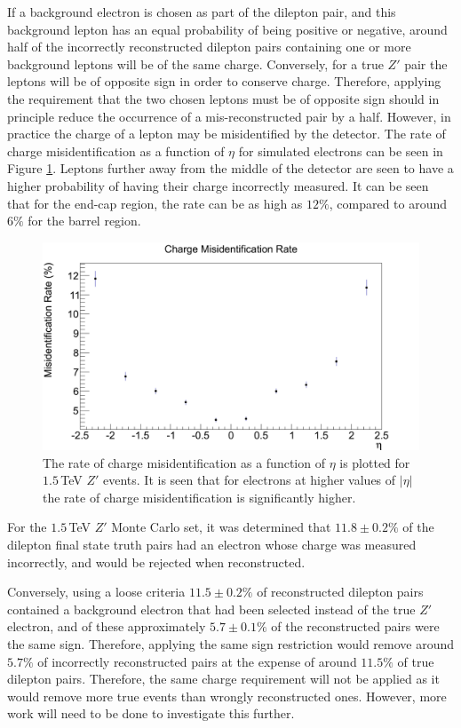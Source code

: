 \documentclass{article}
\begin{document}
If a background electron is chosen as part of the dilepton pair, and this background lepton has an equal probability of being positive or negative, around half of the incorrectly reconstructed dilepton pairs containing one or more background leptons will be of the same charge. Conversely, for a true $Z'$ pair the leptons will be of opposite sign in order to conserve charge. Therefore, applying the requirement that the two chosen leptons  must be of opposite sign should in principle reduce the occurrence of a mis-reconstructed pair by a half. However, in practice the charge of a lepton may be misidentified by the detector.
The rate of charge misidentification as a function of $\eta$ for simulated electrons can be seen in Figure \ref{fig:chargeMisID}. Leptons further away from the middle of the detector are seen to have a higher probability of having their charge incorrectly measured. It can be seen that for the end-cap region, the rate can be as high as $12\%$, compared to around $6\%$ for the barrel region.

\begin{figure}[h]
    \centering
    \includegraphics[scale=0.3]{images/chargeMisID.png}
    \caption{The rate of charge misidentification as a function of $\eta$ is plotted for $1.5\,$TeV $Z'$ events. It is seen that for electrons at higher values of $|\eta|$ the rate of charge misidentification is significantly higher. \label{fig:chargeMisID}}
\end{figure}


For the $1.5\,$TeV $Z'$ Monte Carlo set, it was determined that $11.8\pm0.2\%$ of the dilepton final state truth pairs had an electron whose charge was measured incorrectly, and would be rejected when reconstructed.

Conversely, using a loose criteria $11.5\pm0.2\%$ of reconstructed dilepton pairs contained a background electron that had been selected instead of the true $Z'$ electron, and of these approximately $5.7\pm0.1\%$ of the reconstructed pairs were the same sign. Therefore, applying the same sign restriction would remove around $5.7\%$ of incorrectly reconstructed pairs at the expense of around $11.5\%$ of true dilepton pairs. Therefore, the same charge requirement will not be applied as it would remove more true events than wrongly reconstructed ones. However, more work will need to be done to investigate this further.
\end{document}
